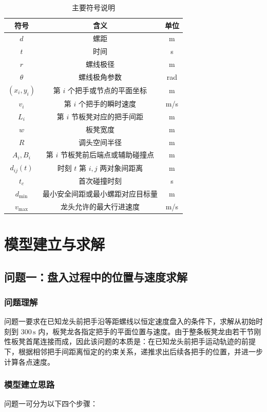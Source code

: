 \documentclass[12pt,a4paper]{ctexart}
\begin{document}
\begin{table}[H]
\centering
\caption{主要符号说明}
\begin{tabular}{ccc}
\toprule
符号 & 含义 & 单位 \\
\midrule
$d$ & 螺距 & m \\
$t$ & 时间 & s \\
$r$ & 螺线极径 & m \\
$\theta$ & 螺线极角参数 & rad \\
$(x_i,y_i)$ & 第 $i$ 个把手或节点的平面坐标 & m \\
$v_i$ & 第 $i$ 个把手的瞬时速度 & m/s \\
$L_i$ & 第 $i$ 节板凳对应的把手间距 & m \\
$w$ & 板凳宽度 & m \\
$R$ & 调头空间半径 & m \\
$A_i,B_i$ & 第 $i$ 节板凳前后端点或辅助碰撞点 & m \\
$d_{ij}(t)$ & 时刻 $t$ 第 $i,j$ 两对象间距离 & m \\
$t_c$ & 首次碰撞时刻 & s \\
$d_{\min}$ & 最小安全间距或最小螺距对应目标量 & m \\
$v_{\max}$ & 龙头允许的最大行进速度 & m/s \\
\bottomrule
\end{tabular}
\end{table}

\section{模型建立与求解}

\subsection{问题一：盘入过程中的位置与速度求解}

\subsubsection{问题理解}
问题一要求在已知龙头前把手沿等距螺线以恒定速度盘入的条件下，求解从初始时刻到 $300\,\mathrm{s}$ 内，板凳龙各指定把手的平面位置与速度。由于整条板凳龙由若干节刚性板凳首尾连接而成，因此该问题的本质是：在已知龙头前把手运动轨迹的前提下，根据相邻把手间距离恒定的约束关系，递推求出后续各把手的位置，并进一步计算各点速度。

\subsubsection{模型建立思路}
问题一可分为以下四个步骤：
\end{document}

